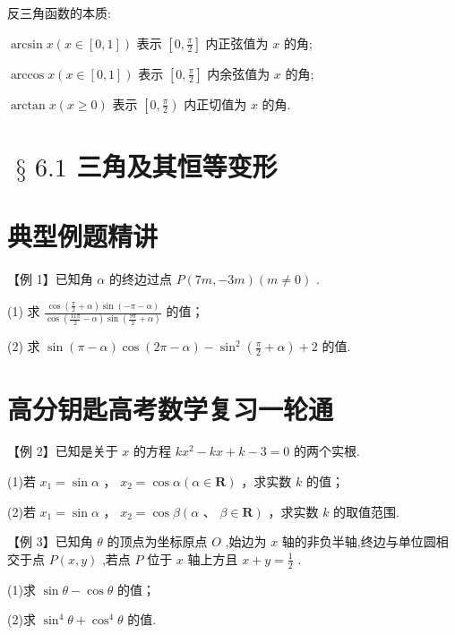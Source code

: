 反三角函数的本质:

$\arcsin x\left( {x \in  \left\lbrack  {0,1}\right\rbrack  }\right)$ 表示 $\left\lbrack  {0,\frac{\pi }{2}}\right\rbrack$ 内正弦值为 $x$ 的角;

$\arccos x\left( {x \in  \left\lbrack  {0,1}\right\rbrack  }\right)$ 表示 $\left\lbrack  {0,\frac{\pi }{2}}\right\rbrack$ 内余弦值为 $x$ 的角;

$\arctan x\left( {x \geq  0}\right)$ 表示 $\left\lbrack  {0,\frac{\pi }{2}}\right)$ 内正切值为 $x$ 的角.

\section*{$\text{ § }{6.1}$ 三角及其恒等变形}

\section*{典型例题精讲}

【例 1】已知角 $\alpha$ 的终边过点 $P\left( {{7m}, - {3m}}\right) \left( {m \neq  0}\right)$ .

(1) 求 $\frac{\cos \left( {\frac{\pi }{2} + \alpha }\right) \sin \left( {-\pi  - \alpha }\right) }{\cos \left( {\frac{11\pi }{2} - \alpha }\right) \sin \left( {\frac{9\pi }{2} + \alpha }\right) }$ 的值；

(2) 求 $\sin \left( {\pi  - \alpha }\right) \cos \left( {{2\pi } - \alpha }\right)  - {\sin }^{2}\left( {\frac{\pi }{2} + \alpha }\right)  + 2$ 的值.

\section*{高分钥匙高考数学复习一轮通}

【例 2】已知是关于 $x$ 的方程 $k{x}^{2} - {kx} + k - 3 = 0$ 的两个实根.

(1)若 ${x}_{1} = \sin \alpha$ ， ${x}_{2} = \cos \alpha \left( {\alpha  \in  \mathbf{R}}\right)$ ，求实数 $k$ 的值；

(2)若 ${x}_{1} = \sin \alpha$ ， ${x}_{2} = \cos \beta \left( {\alpha \text{ 、 }\beta  \in  \mathbf{R}}\right)$ ，求实数 $k$ 的取值范围.

【例 3】已知角 $\theta$ 的顶点为坐标原点 $O$ ,始边为 $x$ 轴的非负半轴,终边与单位圆相交于点 $P\left( {x,y}\right)$ ,若点 $P$ 位于 $x$ 轴上方且 $x + y = \frac{1}{2}$ .

(1)求 $\sin \theta  - \cos \theta$ 的值；

(2)求 ${\sin }^{4}\theta  + {\cos }^{4}\theta$ 的值.

